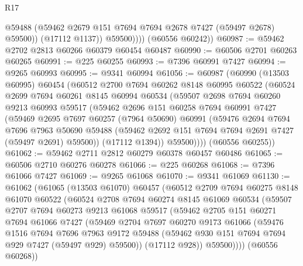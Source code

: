 \begin{lexlean}{R17}
\begin{coremodule}
                  @59488
                  (@59462 @2679 @151 @7694 @7694 @2678 @7427 (@59497 @2678) @59500))
                (@17112 @1137))
              @59500))))
      (@60556 @60242))
@60987 := @59462 @2702 @2813 @60266 @60379 @60454 @60487
@60990 := @60506 @2701 @60263 @60265
@60991 := @225 @60255
@60993 := @7396 @60991 @7427
@60994 := @9265 @60993
@60995 := @9341 @60994
@61056 := @60987
    (@60990
      (@13503 @60995)
      @60454
      (@60512
        @2700
        @7694
        @60262
        @8148
        @60995
        @60522
        (@60524
          @2699
          @7694
          @60261
          @8145
          @60994
          @60534
          (@59507
            @2698
            @7694
            @60260
            @9213
            @60993
            @59517
            (@59462
              @2696
              @151
              @60258
              @7694
              @60991
              @7427
              (@59469
                @2695
                @7697
                @60257
                (@7964 @50690)
                @60991
                (@59476
                  @2694
                  @7694
                  @7696
                  @7963
                  @50690
                  @59488
                  (@59462 @2692 @151 @7694 @7694 @2691 @7427 (@59497 @2691) @59500))
                (@17112 @1394))
              @59500))))
      (@60556 @60255))
@61062 := @59462 @2711 @2812 @60279 @60378 @60457 @60486
@61065 := @60506 @2710 @60276 @60278
@61066 := @225 @60268
@61068 := @7396 @61066 @7427
@61069 := @9265 @61068
@61070 := @9341 @61069
@61130 := @61062
    (@61065
      (@13503 @61070)
      @60457
      (@60512
        @2709
        @7694
        @60275
        @8148
        @61070
        @60522
        (@60524
          @2708
          @7694
          @60274
          @8145
          @61069
          @60534
          (@59507
            @2707
            @7694
            @60273
            @9213
            @61068
            @59517
            (@59462
              @2705
              @151
              @60271
              @7694
              @61066
              @7427
              (@59469
                @2704
                @7697
                @60270
                @9173
                @61066
                (@59476
                  @1516
                  @7694
                  @7696
                  @7963
                  @9172
                  @59488
                  (@59462 @930 @151 @7694 @7694 @929 @7427 (@59497 @929) @59500))
                (@17112 @928))
              @59500))))
      (@60556 @60268))

\end{coremodule}
\end{lexlean}
